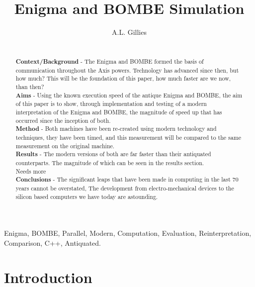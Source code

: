 \documentclass[12pt,a4paper]{article}
\title{Enigma and BOMBE Simulation}
\author{A.L. Gillies}
\date{}
\begin{document}
\maketitle

\begin{abstract}\\

{\bf Context/Background} - The Enigma and BOMBE formed the basis of communication throughout the Axis powers. Technology has advanced since then, but how much? This will be the foundation of this paper, how much faster are we now, than then?\\

{\bf Aims} - Using the known execution speed of the antique Enigma and BOMBE, the aim of this paper is to show, through implementation and testing of a modern interpretation of the Enigma and BOMBE, the magnitude of speed up that has occurred since the inception of both.\\

{\bf Method} - Both machines have been re-created using modern technology and techniques, they have been timed, and this measurement will be compared to the same measurement on the original machine.\\

{\bf Results} - The modern versions of both are far faster than their antiquated counterparts. The magnitude of which can be seen in the results section.\\ Needs more \\

{\bf Conclusions} - The significant leaps that have been made in computing in the last 70 years cannot be overstated, The development from electro-mechanical devices to the silicon based computers we have today are astounding.
\end{abstract}

\begin{keywords}
Enigma, BOMBE, Parallel, Modern, Computation, Evaluation, Reinterpretation, Comparison, C++, Antiquated.
\end{keywords}



\section{Introduction}

\end{document}
